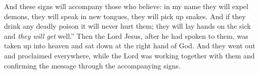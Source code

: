 \begin{biblechapter}
{\verse And these signs will accompany those who believe: in my name they will expel demons, they will speak in new tongues,
\verse they will pick up snakes. And if they drink any deadly poison it will never hurt them; they will lay hands on the sick and \textit{they will get} well.”
\verse Then the Lord Jesus, after he had spoken to them, was taken up into heaven and sat down at the right hand of God.
\verse And they went out and proclaimed everywhere, while the Lord was working together with them and confirming the message through the accompanying signs.}
\end{biblechapter}

